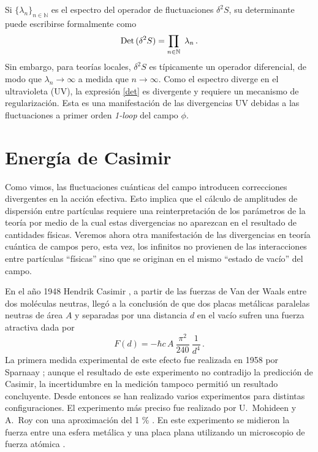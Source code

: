 Si $ \{ \lambda _n \} _{n \in \mathbb N}$ es el espectro del operador de fluctuaciones $ \delta ^2 S $, su determinante puede escribirse formalmente como
\begin{equation}\label{det}
{\rm Det}\,(\delta ^2 S) = \prod_{ n \in \mathbb N }\ \lambda _n\,.
\end{equation}
Sin embargo, para teorías locales, $\delta ^2 S$ es típicamente un operador diferencial, de modo que $\lambda_n\to\infty$ a medida que $n\to \infty$. Como el espectro diverge en el ultravioleta (UV), la expresión \eqref{det} es divergente y requiere un mecanismo de regularización. Esta es una manifestación de las divergencias UV debidas a las fluctuaciones a primer orden {\it 1-loop} del campo $\phi$.


\section{Energía de Casimir}\label{sec.casimir}

Como vimos, las fluctuaciones cuánticas del campo introducen correcciones divergentes en la acción efectiva. Esto implica que el cálculo de amplitudes de dispersión entre partículas requiere una reinterpretación de los parámetros de la teoría por medio de la cual estas divergencias no aparezcan en el resultado de cantidades físicas. Veremos ahora otra manifestación de las divergencias en teoría cuántica de campos pero, esta vez, los infinitos no provienen de las interacciones entre partículas ``físicas'' sino que se originan en el mismo ``estado de vacío'' del campo.


En el año 1948 Hendrik Casimir \cite{Casimir:1948dh}, a partir de las fuerzas de Van der Waals entre dos moléculas neutras, llegó a la conclusión de que dos placas metálicas paralelas neutras de área $A$ y separadas por una distancia $d$ en el vacío sufren una fuerza atractiva dada por
\begin{equation}
		F(d) = - \hbar c\,A\ \frac{\pi ^2 }{240}\ \frac{1}{d^4}\,.
	\label{casimir.1}
\end{equation}
La primera medida experimental de este efecto fue realizada en 1958 por Sparnaay \cite{SPARNAAY1958751}; aunque el resultado de este experimento no contradijo la predicción de Casimir, la incertidumbre en la medición tampoco permitió un resultado concluyente. Desde entonces se han realizado varios experimentos para distintas configuraciones. El experimento más preciso \cite{Chiu_2008} fue realizado por U.\ Mohideen y A.\ Roy  con una aproximación del 1 \% . En este experimento se midieron la fuerza entre una esfera metálica y una placa plana utilizando un microscopio de fuerza atómica \cite{PhysRevLett.81.4549,PhysRevD.60.111101,PhysRevA.62.052109}.

